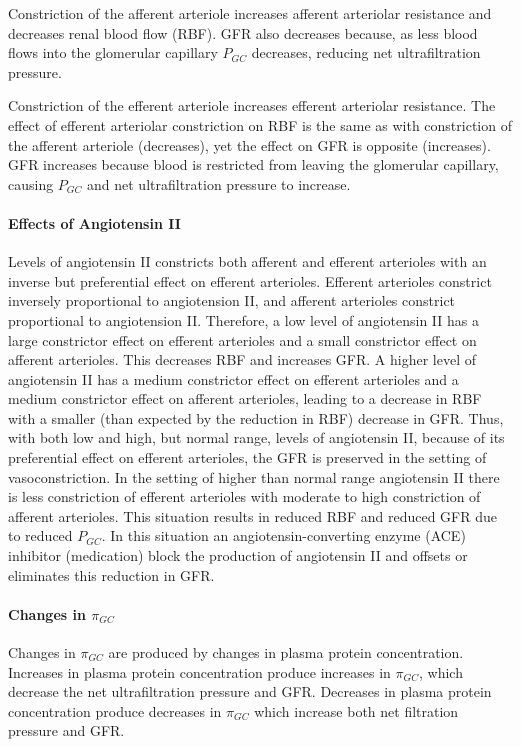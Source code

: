 Constriction of the afferent arteriole increases afferent arteriolar resistance and decreases renal blood flow (RBF). GFR also decreases because, as less blood flows into the glomerular capillary $P_{GC}$ decreases, reducing net ultrafiltration pressure.

Constriction of the efferent arteriole increases efferent arteriolar resistance. The effect of efferent arteriolar constriction on RBF is the same as with constriction of the afferent arteriole (decreases), yet the effect on GFR is opposite (increases). GFR increases because blood is restricted from leaving the glomerular capillary, causing $P_{GC}$ and net ultrafiltration pressure to increase.

\paragraph{Effects of Angiotensin II}

Levels of angiotensin II constricts both afferent and efferent arterioles with an inverse but preferential effect on efferent arterioles. Efferent arterioles constrict inversely proportional to angiotension II, and afferent arterioles constrict proportional to angiotension II. Therefore, a low level of angiotensin II has a large constrictor effect on efferent arterioles and a small constrictor effect on afferent arterioles. This decreases RBF and increases GFR. A higher level of angiotensin II has a medium constrictor effect on efferent arterioles and a medium constrictor effect on afferent arterioles, leading to a decrease in RBF with a smaller (than expected by the reduction in RBF) decrease in GFR. Thus, with both low and high, but normal range, levels of angiotensin II, because of its preferential effect on efferent arterioles, the GFR is preserved in the setting of vasoconstriction. In the setting of higher than normal range angiotensin II there is less constriction of efferent arterioles with moderate to high constriction of afferent arterioles. This situation results in reduced RBF and reduced GFR due to reduced  $P_{GC}$. In this situation an angiotensin-converting enzyme (ACE) inhibitor (medication) block the production of angiotensin II and offsets or eliminates this reduction in GFR.

\paragraph{Changes in $\pi_{GC}$}

Changes in $\pi_{GC}$ are produced by changes in plasma protein concentration. Increases in plasma protein concentration produce increases in $\pi_{GC}$, which decrease the net ultrafiltration pressure and GFR. Decreases in plasma protein concentration produce decreases in $\pi_{GC}$ which increase both net filtration pressure and GFR.

